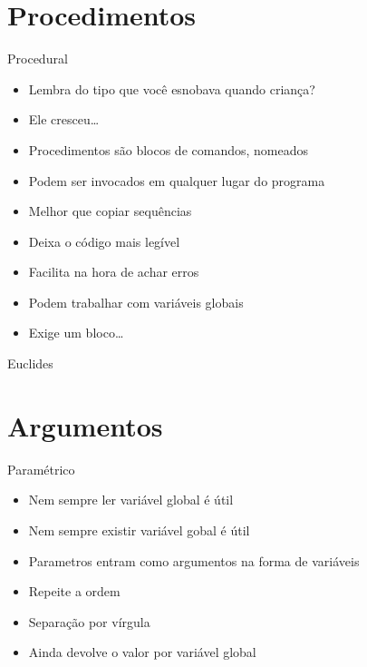 \documentclass[14pt]{beamer}
\begin{document}
	\section{Procedimentos}
		\begin{frame}{Procedural}
			\begin{itemize}
				\presentationPause\item Lembra do tipo  que você esnobava quando criança?
				\presentationPause\item Ele cresceu\dots
				\presentationPause\item Procedimentos são blocos de comandos, nomeados
				\presentationPause\item Podem ser invocados em qualquer lugar do programa
				\presentationPause\item Melhor que copiar sequências
				\presentationPause\item Deixa o código mais legível
				\presentationPause\item Facilita na hora de achar erros
				\presentationPause\item Podem trabalhar com variáveis globais
				\presentationPause\item Exige um bloco\dots
			\end{itemize}
			\presentationPause
		\end{frame}

		\begin{frame}{Euclides}
			\presentationPause
		\end{frame}

	\section{Argumentos}
		\begin{frame}{Paramétrico}
			\begin{itemize}
				\presentationPause\item Nem sempre ler variável global é útil
				\presentationPause\item Nem sempre existir variável gobal é útil
				\presentationPause\item Parametros entram como argumentos na forma de variáveis
				\presentationPause\item Repeite a ordem
				\presentationPause\item Separação por vírgula
				\presentationPause\item Ainda devolve o valor por variável global
			\end{itemize}
			\presentationPause
		\end{frame}
\end{document}
